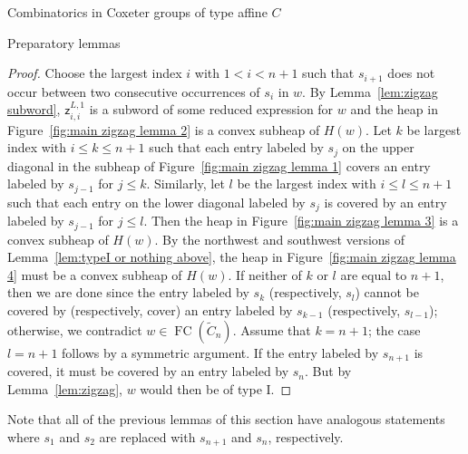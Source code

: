 \documentclass[11pt]{amsart}
\theoremstyle{definition}
\numberwithin{equation}{section}
\newcommand{\C}{\widetilde{C}}
\newcommand{\z}{\mathsf{z}}
\renewcommand{\(}{\left(}
\renewcommand{\)}{\right)}
\DeclareMathOperator{\FC}{FC}
\begin{document}
\begin{section}{Combinatorics in Coxeter groups of type affine $C$}
\begin{subsection}{Preparatory lemmas}
\begin{proof}
Choose the largest index $i$ with $1<i<n+1$ such that $s_{i+1}$ does not occur between two consecutive occurrences of $s_{i}$ in $w$.  By Lemma~\ref{lem:zigzag subword}, $\z_{i,i}^{L,1}$ is a subword of some reduced expression for $w$ and the heap in Figure~\ref{fig:main zigzag lemma 2} is a convex subheap of $H(w)$.  Let $k$ be largest index with $i\leq k \leq n+1$ such that each entry labeled by $s_{j}$ on the upper diagonal in the subheap of Figure~\ref{fig:main zigzag lemma 1} covers an entry labeled by $s_{j-1}$ for $j\leq k$.  Similarly, let $l$ be the largest index with $i\leq l \leq n+1$ such that each entry on the lower diagonal labeled by $s_{j}$ is covered by an entry labeled by $s_{j-1}$ for $j\leq l$.  Then the heap in Figure~\ref{fig:main zigzag lemma 3} is a convex subheap of $H(w)$.  By the northwest and southwest versions of Lemma~\ref{lem:typeI or nothing above}, the heap in Figure~\ref{fig:main zigzag lemma 4} must be a convex subheap of $H(w)$.  If neither of $k$ or $l$ are equal to $n+1$, then we are done since the entry labeled by $s_{k}$ (respectively, $s_{l}$) cannot be covered by (respectively, cover) an entry labeled by $s_{k-1}$ (respectively, $s_{l-1}$); otherwise, we contradict $w \in \FC(\C_{n})$.  Assume that $k=n+1$; the case $l=n+1$ follows by a symmetric argument.  If the entry labeled by $s_{n+1}$ is covered, it must be covered by an entry labeled by $s_{n}$.  But by Lemma~\ref{lem:zigzag}, $w$ would then be of type I.
\end{proof}

Note that all of the previous lemmas of this section have analogous statements where $s_{1}$ and $s_{2}$ are replaced with $s_{n+1}$ and $s_{n}$, respectively.

\end{subsection}

\end{section}

\end{document}
